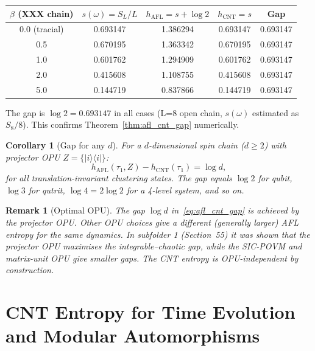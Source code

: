 \documentclass[12pt,a4paper]{article}
\newtheorem{corollary}[theorem]{Corollary}
\newtheorem{remark}[theorem]{Remark}
\begin{document}
\begin{center}
\begin{tabular}{@{}ccccc@{}}
\toprule
$\beta$ (XXX chain) & $s(\omega)=S_L/L$ & $h_\mathrm{AFL}=s+\log 2$ & $h_\mathrm{CNT}=s$ & Gap \\
\midrule
0.0 (tracial) & 0.693147 & 1.386294 & 0.693147 & 0.693147 \\
0.5           & 0.670195 & 1.363342 & 0.670195 & 0.693147 \\
1.0           & 0.601762 & 1.294909 & 0.601762 & 0.693147 \\
2.0           & 0.415608 & 1.108755 & 0.415608 & 0.693147 \\
5.0           & 0.144719 & 0.837866 & 0.144719 & 0.693147 \\
\bottomrule
\end{tabular}
\end{center}

\vspace{4pt}\noindent
The gap is $\log 2 = 0.693147$ in all cases (L=8 open chain, $s(\omega)$ estimated as $S_8/8$).
This confirms Theorem~\ref{thm:afl_cnt_gap} numerically.

\begin{corollary}[Gap for any $d$]\label{cor:gap_d}
For a $d$-dimensional spin chain ($d\ge 2$) with projector OPU $Z=\{|i\rangle\langle i|\}$:
\begin{equation}\label{eq:gap_d}
  h_\mathrm{AFL}(\tau_1,Z) - h_\mathrm{CNT}(\tau_1) = \log d,
\end{equation}
for all translation-invariant clustering states.  The gap equals $\log 2$ for qubit,
$\log 3$ for qutrit, $\log 4=2\log 2$ for a 4-level system, and so on.
\end{corollary}

\begin{remark}[Optimal OPU]\label{rmk:optimal_opu}
The gap $\log d$ in~\eqref{eq:afl_cnt_gap} is achieved by the projector OPU.
Other OPU choices give a different (generally larger) AFL entropy for the same dynamics.
In subfolder 1 (Section~55) it was shown that the projector OPU maximises the
integrable--chaotic gap, while the SIC-POVM and matrix-unit OPU give smaller gaps.
The CNT entropy is OPU-independent by construction.
\end{remark}

\section{CNT Entropy for Time Evolution and Modular Automorphisms}
\label{sec:time_evolution}
\end{document}
